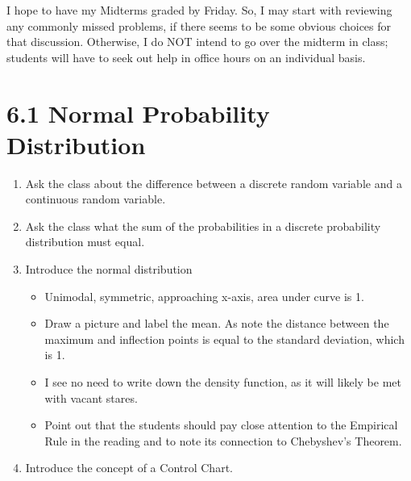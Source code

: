 \documentclass{article}
\begin{document}
I hope to have my Midterms graded by Friday. So, I may start with reviewing any commonly missed problems, if there seems to be some obvious choices for that discussion. Otherwise, I do NOT intend to go over the midterm in class; students will have to seek out help in office hours on an individual basis.
 
\section*{6.1 Normal Probability Distribution}

    \begin{enumerate}
    
        \item Ask the class about the difference between a discrete random variable and a continuous random variable.
        
        \item Ask the class what the sum of the probabilities in a discrete probability distribution must equal.
        
        \item Introduce the normal distribution
        
            \begin{itemize}
            
                \item Unimodal, symmetric, approaching x-axis, area under curve is 1.  
                
                \item Draw a picture and label the mean. As note the distance between the maximum and inflection points is equal to the standard deviation, which is 1.
                
                \item I see no need to write down the density function, as it will likely be met with vacant stares.
                
                \item Point out that the students should pay close attention to the Empirical Rule in the reading and to note its connection to Chebyshev’s Theorem.
            
            \end{itemize}
            
        \item Introduce the concept of a Control Chart.
        
            \begin{itemize}
            

\end{itemize}
\end{enumerate}
\end{document}
